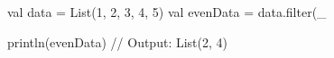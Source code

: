 val data = List(1, 2, 3, 4, 5)
val evenData = data.filter(_ %

println(evenData) // Output: List(2, 4)